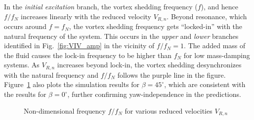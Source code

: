 In the {\em initial excitation} branch, the vortex shedding frequency ($f$),
and hence $f/f_N$ increases linearly with the reduced velocity $V_{R,n}$.
Beyond resonance, which occurs around $f=f_N$, the vortex shedding frequency
gets ``locked-in'' with the natural frequency of the system. This occurs in the
{\em upper} and {\em lower} branches identified in Fig.~\ref{fig:VIV_amp} in
the vicinity of $f/f_N=1$. The added mass of the fluid causes the lock-in
frequency to be higher than $f_N$ for low mass-damping systems. As $V_{R,n}$
increases beyond lock-in, the vortex shedding desynchronizes with the natural
frequency and $f/f_N$ follows the purple line in the figure.
Figure~\ref{fig:VIV_freq} also plots the simulation results for
$\beta=45^\circ$, which are consistent with the results for $\beta=0^\circ$,
further confirming yaw-independence in the predictions.
%
\begin{figure}[htb!]
  \caption{Non-dimensional frequency $f/f_N$ for various reduced velocities
    $V_{R,n}$}
  \label{fig:VIV_freq}
\end{figure}

